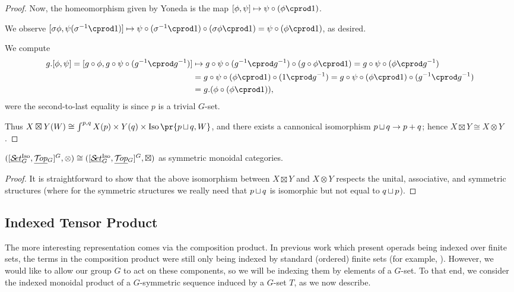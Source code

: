 \documentclass{report}
\newcommand{\Top}{\text{$\mathcal{T}\!op$}}
\newcommand{\Set}{\text{$\mathcal{S}\!et$}}
\DeclareMathOperator{\Iso}{Iso}
\newcommand{\iso}[1]{\text{$\Iso\pr{#1}$}}
\newcommand{\TopG}{\text{\underline{$\Top$}$_G$}}
\newcommand{\SetG}{\text{\underline{$\Set$}$_G^{\mbox{\scriptsize Iso}}$}}
\renewcommand{\ST}{\text{$[\SetG,\TopG]^G$}}
\newcommand{\ico}{\operatornamewithlimits{\sqcup}}
\begin{document}
\begin{proof}
  Now, the homeomorphism given by Yoneda is the map $[\phi,\psi]\mapsto \psi\circ(\phi\cprod 1)$.
  \begin{description}\itemsep-4pt
  \item[well-defined] We observe $[\sigma\phi,\psi(\sigma^{-1}\cprod 1)]\mapsto \psi \circ (\sigma^{-1}\cprod 1)\circ (\sigma\phi\cprod 1) = \psi\circ(\phi\cprod 1)$, as desired.
  \item[equivariant] We compute
    \begin{align*}g.[\phi,\psi] = [g\circ \phi,g\circ\psi\circ (g^{-1}\cprod g^{-1})]&\mapsto g\circ\psi\circ(g^{-1}\cprod g^{-1})\circ(g\circ \phi \cprod 1) = g\circ \psi\circ(\phi\cprod g^{-1})\\
      &=g\circ \psi\circ (\phi\cprod 1)\circ(1\cprod g^{-1})=g\circ\psi\circ(\phi\cprod 1)\circ(g^{-1}\cprod g^{-1})\\
      &= g.(\phi\circ(\phi\cprod 1)),
    \end{align*}
    were the second-to-last equality is since $p$ is a trivial $G$-set. 
  \end{description}
  Thus $X\boxtimes Y(W) \cong \int^{p,q}X(p)\times Y(q)\times\iso{p\ico q,W}$, and there exists a cannonical isomorphism $p\ico q\to p+q$; hence $X\boxtimes Y\cong X\otimes Y$.
\end{proof}
\begin{prop}
  $(\ST,\otimes) \cong (\ST,\boxtimes)$ as symmetric monoidal categories.
\end{prop}
\begin{proof}
  It is straightforward to show that the above isomorphism between $X\boxtimes Y$ and $X\otimes Y$ respects the unital, associative, and symmetric structures (where for the symmetric structures we really need that $p\ico q$ is isomorphic but not equal to $q\ico p$).
\end{proof}

\subsection{Indexed Tensor Product}
The more interesting representation comes via the composition product. In previous work which present operads being indexed over finite sets, the terms in the composition product were still only being indexed by standard (ordered) finite sets (for example, \cite{ching_note_2012}). However, we would like to allow our group $G$ to act on these components, so we will be indexing them by elements of a $G$-set. To that end, we consider the indexed monoidal product of a $G$-symmetric sequence induced by a $G$-set $T$, as we now describe.
\end{document}
